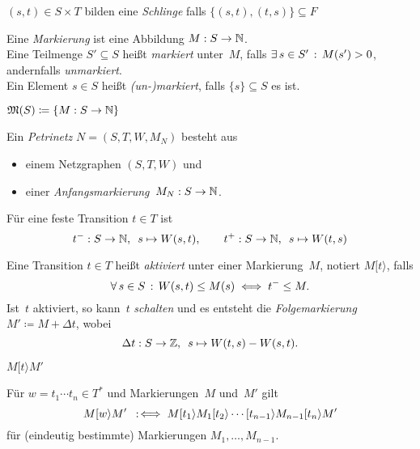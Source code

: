 \documentclass{cheat-sheet}
\newcommand{\activeTransition}[1]{[{#1}\rangle} %
\newcommand{\Markings}{\mathfrak{M}} %
\begin{document}
\begin{defn}
  $(s, t) \in S \times T$ bilden eine \emph{Schlinge} falls $\{ (s, t), (t, s) \} \subseteq F$
\end{defn}

\begin{defn}
  Eine \emph{Markierung} ist eine Abbildung $M : S \to \mathbb{N}$. \\
  Eine Teilmenge $S' \subseteq S$ heißt \emph{markiert} unter~$M$, falls $\exists \, {s \in S'} \,:\, M(s') > 0$, andernfalls \textit{unmarkiert}. \\
  Ein Element $s \in S$ heißt \textit{(un-)markiert}, falls $\{ s \} \subseteq S$ es ist.
\end{defn}

\begin{nota}
  $\Markings(S) \coloneqq \{ M : S \to \N \}$
\end{nota}

\begin{defn}
  Ein \emph{Petrinetz} $N = (S, T, W, M_N)$ besteht aus
  \begin{itemize}
    \item einem Netzgraphen $(S, T, W)$ und
    \item einer \textit{Anfangsmarkierung}~$M_N : S \to \mathbb{N}$.
  \end{itemize}
\end{defn}

\begin{nota}
  Für eine feste Transition $t \in T$ ist
  \[
    t^{-} : S \to \mathbb{N}, \enspace s \mapsto W(s, t), \qquad
    t^{+} : S \to \mathbb{N}, \enspace s \mapsto W(t, s)
  \]
\end{nota}

\begin{defn}
  Eine Transition $t \in T$ heißt \emph{aktiviert} unter einer Markierung~$M$, notiert $M \activeTransition{t}$, falls
  \[
    \forall \, {s \in S} \,:\, W(s, t) \leq M(s) \iff
    t^{-} \leq M.
  \]
  Ist~$t$ aktiviert, so kann~$t$ \textit{schalten} und es entsteht die \textit{Folgemarkierung} $M' \coloneqq M + \Delta t$, wobei
  \[
    \Delta t : S \to \mathbb{Z}, \enspace s \mapsto W(t, s) - W(s, t).
  \]
\end{defn}

\begin{nota}
  $M \activeTransition{t} M'$
\end{nota}

\begin{defn}
  Für $w = t_1 \cdots t_n \in T^{*}$ und Markierungen~$M$ und~$M'$ gilt
  \[ M \activeTransition{w} M' \coloniff M \activeTransition{t_1} M_1 \activeTransition{t_2} \cdots \activeTransition{t_{n-1}} M_{n-1} \activeTransition{t_n} M' \]
  für (eindeutig bestimmte) Markierungen $M_1, \ldots, M_{n-1}$. \\
\end{defn}
\end{document}
